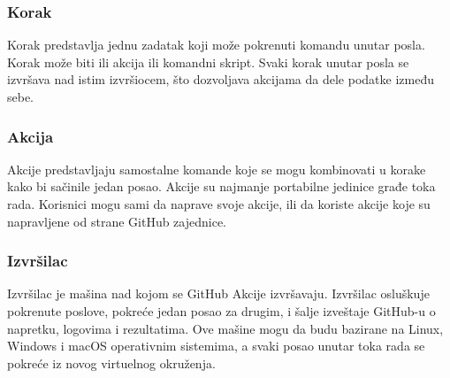 \subsubsection{Korak}
Korak predstavlja jednu zadatak koji može pokrenuti komandu unutar posla. Korak može biti ili akcija ili 
komandni skript. Svaki korak unutar posla se izvršava nad istim izvršiocem, što dozvoljava akcijama da 
dele podatke između sebe.

\subsubsection{Akcija}
Akcije predstavljaju samostalne komande koje se mogu kombinovati u korake kako bi sačinile jedan posao.
Akcije su najmanje portabilne jedinice građe toka rada. Korisnici mogu sami da naprave svoje akcije,
ili da koriste akcije koje su napravljene od strane GitHub zajednice. 

\subsubsection{Izvršilac}
Izvršilac je mašina nad kojom se GitHub Akcije izvršavaju. Izvršilac osluškuje pokrenute poslove,
pokreće jedan posao za drugim, i šalje izveštaje GitHub-u o napretku, logovima i rezultatima. Ove 
mašine mogu da budu bazirane na Linux, Windows i macOS operativnim sistemima, a svaki posao 
unutar toka rada se pokreće iz novog virtuelnog okruženja.~\cite{GitHubActions}
